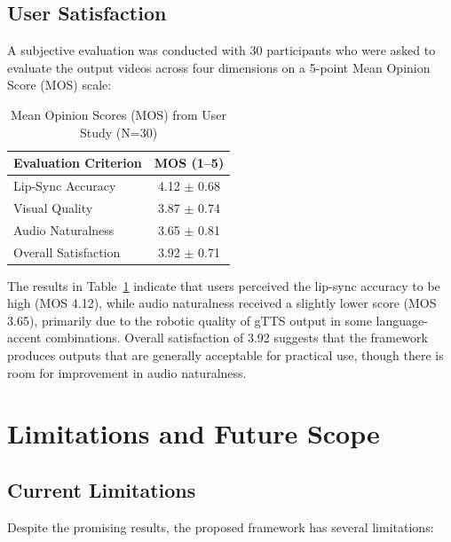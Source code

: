 \documentclass[conference]{IEEEtran}
\begin{document}
\subsection{User Satisfaction}

A subjective evaluation was conducted with 30 participants who were asked to evaluate the output videos across four dimensions on a 5-point Mean Opinion Score (MOS) scale:

\begin{table}[htbp]
\caption{Mean Opinion Scores (MOS) from User Study (N=30)}
\begin{center}
\begin{tabular}{lc}
\toprule
\textbf{Evaluation Criterion} & \textbf{MOS (1--5)} \\
\midrule
Lip-Sync Accuracy & 4.12 $\pm$ 0.68 \\
Visual Quality & 3.87 $\pm$ 0.74 \\
Audio Naturalness & 3.65 $\pm$ 0.81 \\
Overall Satisfaction & 3.92 $\pm$ 0.71 \\
\bottomrule
\end{tabular}
\label{tab:mos}
\end{center}
\end{table}

The results in Table~\ref{tab:mos} indicate that users perceived the lip-sync accuracy to be high (MOS 4.12), while audio naturalness received a slightly lower score (MOS 3.65), primarily due to the robotic quality of gTTS output in some language-accent combinations. Overall satisfaction of 3.92 suggests that the framework produces outputs that are generally acceptable for practical use, though there is room for improvement in audio naturalness.

\section{Limitations and Future Scope}

\subsection{Current Limitations}

Despite the promising results, the proposed framework has several limitations:
\end{document}
